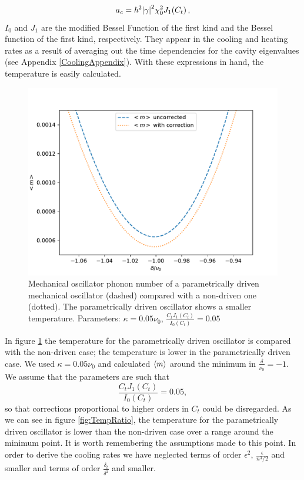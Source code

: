 \documentclass[reprint, amsmath,amssymb, aps,pra]{revtex4-1}
\begin{document}
\begin{equation}
a_c= \hbar^2\abs{\gamma}^2\chi_0^2 J_1(C_t)\, ,
\end{equation}
$I_0$ and $J_1$ are the modified Bessel Function of the first kind and
the Bessel function of the first kind, respectively. They appear in
the cooling and heating rates as a result of averaging out the time
dependencies for the cavity eigenvalues (see Appendix
\ref{CoolingAppendix}).
With these expressions in hand, the temperature is easily calculated.


\begin{figure}[h!]
\includegraphics[scale=.5]{TempGorden1-.pdf}   
\caption{ Mechanical oscillator phonon number of a parametrically
  driven mechanical oscillator (dashed) compared with a non-driven one
  (dotted). The parametrically driven oscillator shows a smaller
  temperature. Parameters: $\kappa = 0.05\nu_0$,
  $\frac{C_tJ_1(C_t)}{I_0(C_t)} = 0.05$}\label{fig:TempComparisson-}
\end{figure}

In figure \ref{fig:TempComparisson-} the temperature for the
parametrically driven oscillator is compared with the non-driven case;
the temperature is lower in the parametrically driven case. We used
$\kappa = 0.05\nu_0$ and calculated $\expval{m}$ around the minimum in
$\frac{\delta}{\nu_0}=-1$. We assume that the parameters are such that
\begin{equation}
\frac{C_tJ_1(C_t)}{I_0(C_t)} = 0.05,
\end{equation}
so that corrections proportional to higher orders in $C_t$ could be
disregarded. As we can see in figure \ref{fig:TempRatio}, the
temperature for the parametrically driven oscillator is lower than the
non-driven case over a range around the minimum point. 
It is worth remembering the assumptions made to this point. In order
to derive the cooling rates we have neglected terms of order
$\epsilon^2$, $\frac{\epsilon}{n^3/2}$ and smaller and terms of order
$\frac{\delta_t}{\delta^2}$ and smaller.
\end{document}
